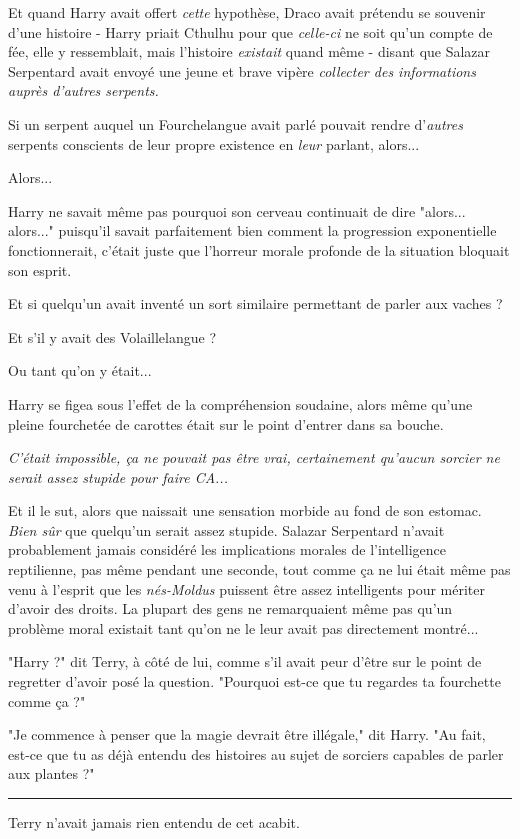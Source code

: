 Et quand Harry avait offert \emph{cette}  hypothèse, Draco avait prétendu se souvenir d'une histoire - Harry priait Cthulhu pour que \emph{celle-ci}  ne soit qu'un compte de fée, elle y ressemblait, mais l'histoire \emph{existait}  quand même - disant que Salazar Serpentard avait envoyé une jeune et brave vipère \emph{collecter des informations auprès d'autres serpents.} 

Si un serpent auquel un Fourchelangue avait parlé pouvait rendre d'\emph{autres}  serpents conscients de leur propre existence en \emph{leur}  parlant, alors...

Alors...

Harry ne savait même pas pourquoi son cerveau continuait de dire "alors... alors..." puisqu'il savait parfaitement bien comment la progression exponentielle fonctionnerait, c'était juste que l'horreur morale profonde de la situation bloquait son esprit.

Et si quelqu'un avait inventé un sort similaire permettant de parler aux vaches ?

Et s'il y avait des Volaillelangue ?

Ou tant qu'on y était...

Harry se figea sous l'effet de la compréhension soudaine, alors même qu'une pleine fourchetée de carottes était sur le point d'entrer dans sa bouche.

\emph{C'était impossible, ça ne pouvait pas être vrai, certainement qu'aucun sorcier ne serait assez stupide pour faire CA...} 

Et il le sut, alors que naissait une sensation morbide au fond de son estomac. \emph{Bien sûr}  que quelqu'un serait assez stupide. Salazar Serpentard n'avait probablement jamais considéré les implications morales de l'intelligence reptilienne, pas même pendant une seconde, tout comme ça ne lui était même pas venu à l'esprit que les \emph{nés-Moldus}  puissent être assez intelligents pour mériter d'avoir des droits. La plupart des gens ne remarquaient même pas qu'un problème moral existait tant qu'on ne le leur avait pas directement montré...

"Harry ?" dit Terry, à côté de lui, comme s'il avait peur d'être sur le point de regretter d'avoir posé la question. "Pourquoi est-ce que tu regardes ta fourchette comme ça ?"

"Je commence à penser que la magie devrait être illégale," dit Harry. "Au fait, est-ce que tu as déjà entendu des histoires au sujet de sorciers capables de parler aux plantes ?"
\par\noindent\rule{\textwidth}{0.4pt}
Terry n'avait jamais rien entendu de cet acabit.

